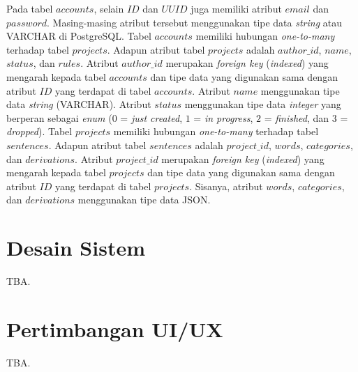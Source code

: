 Pada tabel $accounts$, selain $ID$ dan $UUID$ juga memiliki atribut $email$ dan
$password$. Masing-masing atribut tersebut menggunakan tipe data \textit{string}
atau VARCHAR di PostgreSQL.
Tabel $accounts$ memiliki hubungan \textit{one-to-many} terhadap tabel $projects$.
Adapun atribut tabel $projects$ adalah $author\_id$, $name$, $status$, dan $rules$.
Atribut $author\_id$ merupakan \textit{foreign key} (\textit{indexed}) yang
mengarah kepada tabel $accounts$ dan tipe data yang digunakan sama dengan
atribut $ID$ yang terdapat di tabel $accounts$.
Atribut $name$ menggunakan tipe data \textit{string} (VARCHAR).
Atribut $status$ menggunakan tipe data \textit{integer} yang berperan sebagai
\textit{enum} ($0$ = \textit{just created}, $1$ = \textit{in progress},
$2$ = \textit{finished}, dan $3$ = \textit{dropped}).
Tabel $projects$ memiliki hubungan \textit{one-to-many} terhadap tabel $sentences$.
Adapun atribut tabel $sentences$ adalah $project\_id$, $words$, $categories$, dan
$derivations$. Atribut $project\_id$ merupakan \textit{foreign key}
(\textit{indexed}) yang mengarah kepada tabel $projects$ dan tipe data yang digunakan
sama dengan atribut $ID$ yang terdapat di tabel $projects$.
Sisanya, atribut $words$, $categories$, dan $derivations$ menggunakan tipe data JSON.


\section{Desain Sistem}
TBA.


\section{Pertimbangan UI/UX}
TBA.
